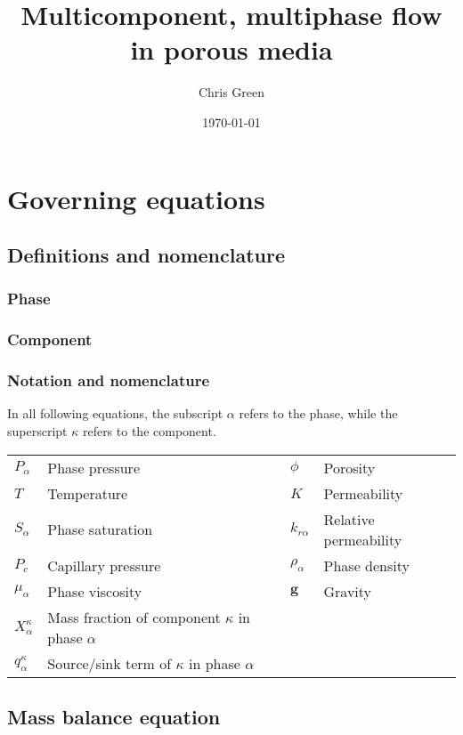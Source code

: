 \documentclass[11pt, oneside, a4paper]{article}
\title{Multicomponent, multiphase flow in porous media}
\author{Chris Green}
\date{\today}
\begin{document}
\maketitle

\section{Governing equations}

\subsection{Definitions and nomenclature}

\subsubsection*{Phase}


\subsubsection*{Component}

\subsubsection*{Notation and nomenclature}

In all following equations, the subscript $\alpha$ refers to the phase, while the superscript $\kappa$ refers to the component.

\begin{table}[h]
\begin{tabular}{llll}
$P_{\alpha}$ & Phase pressure & $\phi$ & Porosity \\
$T$ & Temperature & $K$ & Permeability \\
$S_{\alpha}$ & Phase saturation & $k_{r \alpha}$ & Relative permeability \\
$P_c$ & Capillary pressure & $\rho_{\alpha}$ & Phase density \\
$\mu_{\alpha}$ & Phase viscosity & $\mathbf{g}$ & Gravity \\
$X_{\alpha}^{\kappa}$ & Mass fraction of component $\kappa$ in phase $\alpha$ & & \\
$q_{\alpha}^{\kappa}$ & Source/sink term of $\kappa$ in phase $\alpha$ & &
\end{tabular}
\label{default}
\end{table}

\subsection{Mass balance equation}
\end{document}
